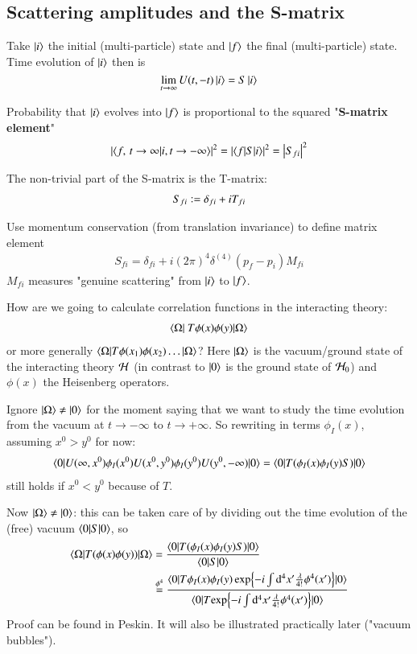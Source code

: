 \subsection{Scattering amplitudes and the S-matrix}
Take $\ket{i}$ the initial (multi-particle) state and $\ket{f}$ the final (multi-particle) state. Time evolution of $\ket{i}$ then is
$$\lim_{t\rightarrow\infty} U(t,-t) \ket{i} = S \ket{i}$$

Probability that $\ket{i}$ evolves into $\ket{f}$ is proportional to the squared "\textbf{S-matrix element}"
\begin{align}
	\left|	\braket{f,\, t\to \infty | i, t\rightarrow - \infty}\right|^2 = \left| \braket{f|S|i} \right|^2 = \left| S_{fi} \right|^2
\end{align}

The non-trivial part of the S-matrix is the T-matrix:
\begin{align}
	S_{fi} \vcentcolon = \delta_{fi} + iT_{fi}
\end{align}

Use momentum conservation (from translation invariance) to define matrix element
\begin{align}
	S_{fi} = \delta_{fi} + i(2\pi)^4 \delta^{(4)}(p_f - p_i) M_{fi}
\end{align}
$M_{fi}$ measures "genuine scattering" from $\ket{i}$ to $\ket{f}$.

How are we going to calculate correlation functions in the interacting theory:
\begin{align*}
	\braket{\Omega |  \ T \phi(x)\phi(y) | \Omega}	
\end{align*}
or more generally $\braket{\Omega | T \phi(x_1)\phi(x_2)\dots | \Omega}$? Here $\ket{\Omega}$ is the vacuum/ground state of the interacting theory $\mathcal{H}$ (in contrast to $\ket{0}$ is the ground state of $\mathcal{H}_0$) and $\phi(x)$ the Heisenberg operators.

Ignore $\ket{\Omega} \neq \ket{0}$ for the moment saying that we want to study the time evolution from the vacuum at $t\rightarrow - \infty$ to $t \rightarrow + \infty$. So rewriting in terms $\phi_I(x)$, assuming $x^0 > y^0$ for now:
\begin{align}
	\braket{0 | U(\infty, x^0) \phi_I(x^0)  U(x^0, y^0) \phi_I(y^0)U(y^0, -\infty) | 0}  = \braket{0|T(\phi_I(x)\phi_I(y)S)|0}
\end{align}
still holds if $x^0 < y^0$ because of $T$.

Now $\ket{\Omega} \neq \ket{0}$: this can be taken care of by dividing out the time evolution of the (free) vacuum $\braket{0|S|0}$, so
\begin{align}
	\braket{\Omega | T(\phi(x)\phi(y))|\Omega} &= \frac{\braket{0 | T(\phi_I(x)\phi_I(y)S)|0}}{\braket{0|S|0}} \\
	&\stackrel{\phi^4}{=} 
	\frac{\braket{0 | T {\phi_I(x)\phi_I(y)\exp{-i\int\dd^4x' \frac{\lambda}{4!}\phi^4(x')}}| 0}}
	{\braket{0 | T {\exp{-i\int\dd^4x' \frac{\lambda}{4!}\phi^4(x')}}| 0}
}\notag
\end{align}
Proof can be found in Peskin. It will also be illustrated practically later ("vacuum bubbles").

